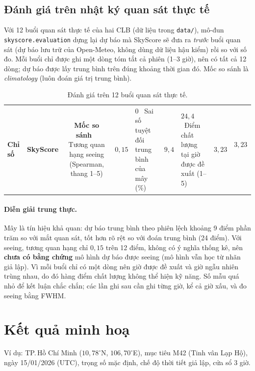 \documentclass[12pt,a4paper]{article}
\begin{document}
\subsection{Đánh giá trên nhật ký quan sát thực tế}
Với 12 buổi quan sát thực tế của hai CLB (dữ liệu trong \texttt{data/}), mô-đun
\texttt{skyscore.evaluation} dựng lại dự báo mà SkyScore sẽ đưa ra \emph{trước} buổi quan sát
(dự báo lưu trữ của Open-Meteo, không dùng dữ liệu hậu kiểm) rồi so với số đo. Mỗi buổi chỉ được
ghi một dòng tóm tắt cả phiên (1--3 giờ), nên có tất cả 12 dòng; dự báo được lấy trung bình
trên đúng khoảng thời gian đó. Mốc so sánh là \emph{climatology} (luôn đoán giá trị trung bình).
\begin{table}[h]
\centering
\begin{tabular}{lcc}
\toprule
\textbf{Chỉ số} & \textbf{SkyScore} & \textbf{Mốc so sánh} \
\midrule
Tương quan hạng seeing (Spearman, thang 1--5) & $0{,}15$ & $0$ \
Sai số tuyệt đối trung bình của mây (\%) & $9{,}4$ & $24{,}4$ \
Điểm chất lượng tại giờ được đề xuất (1--5) & $3{,}23$ & $3{,}23$ \
\bottomrule
\end{tabular}
\caption{Đánh giá trên 12 buổi quan sát thực tế.}
\end{table}

\paragraph{Diễn giải trung thực.}
Mây là tín hiệu khả quan: dự báo trung bình theo phiên lệch khoảng 9 điểm phần trăm so với mắt
quan sát, tốt hơn rõ rệt so với đoán trung bình (24 điểm). Với seeing, tương quan hạng chỉ
$0{,}15$ trên 12 điểm, không có ý nghĩa thống kê, nên \textbf{chưa có bằng chứng} mô hình dự báo
được seeing (mô hình vẫn học từ nhãn giả lập). Vì mỗi buổi chỉ có một dòng nên giờ được đề xuất
và giờ ngẫu nhiên trùng nhau, do đó hàng điểm chất lượng không thể hiện kỹ năng. Số mẫu quá nhỏ
để kết luận chắc chắn; các lần ghi sau cần ghi từng giờ, kể cả giờ xấu, và đo seeing bằng FWHM.

\section{Kết quả minh hoạ}

Ví dụ: TP.\,Hồ Chí Minh ($10{,}78^\circ$N, $106{,}70^\circ$E), mục tiêu M42 (Tinh vân Lạp Hộ),
ngày 15/01/2026 (UTC), trọng số mặc định, chế độ thời tiết giả lập, cửa sổ 3 giờ.
\end{document}
